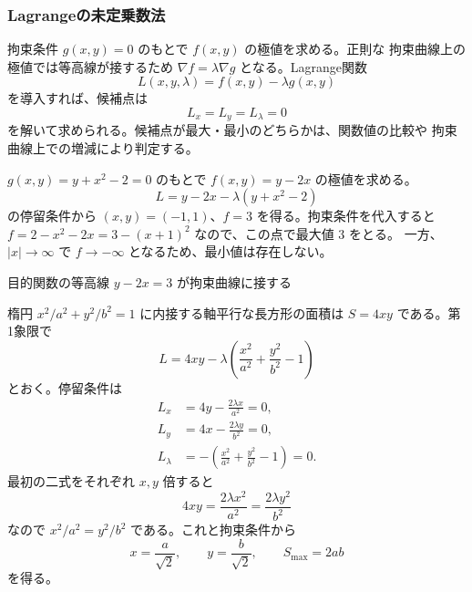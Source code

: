 \subsubsection{Lagrangeの未定乗数法}

拘束条件 $g(x,y)=0$ のもとで $f(x,y)$ の極値を求める。正則な
拘束曲線上の極値では等高線が接するため $\nabla f=\lambda\nabla g$
となる。Lagrange関数
\[
 L(x,y,\lambda)=f(x,y)-\lambda g(x,y)
\]
を導入すれば、候補点は
\begin{equation}
 \boxed{L_x=L_y=L_\lambda=0}
\end{equation}
を解いて求められる。候補点が最大・最小のどちらかは、関数値の比較や
拘束曲線上での増減により判定する。

\begin{example}
$g(x,y)=y+x^2-2=0$ のもとで $f(x,y)=y-2x$ の極値を求める。
\[
 L=y-2x-\lambda(y+x^2-2)
\]
の停留条件から $(x,y)=(-1,1)$、$f=3$ を得る。拘束条件を代入すると
$f=2-x^2-2x=3-(x+1)^2$ なので、この点で最大値 $3$ をとる。
一方、$|x|\to\infty$ で $f\to-\infty$ となるため、最小値は存在しない。

\begin{center}

\small 目的関数の等高線 $y-2x=3$ が拘束曲線に接する
\end{center}
\end{example}

\begin{example}[楕円に内接する長方形]
楕円 $x^2/a^2+y^2/b^2=1$ に内接する軸平行な長方形の面積は
$S=4xy$ である。第1象限で
\[
 L=4xy-\lambda\left(\frac{x^2}{a^2}+\frac{y^2}{b^2}-1\right)
\]
とおく。停留条件は
\begin{align*}
 L_x&=4y-\frac{2\lambda x}{a^2}=0,\\
 L_y&=4x-\frac{2\lambda y}{b^2}=0,\\
 L_\lambda&=-\left(\frac{x^2}{a^2}+\frac{y^2}{b^2}-1\right)=0.
\end{align*}
最初の二式をそれぞれ $x,y$ 倍すると
\[
 4xy=\frac{2\lambda x^2}{a^2}
     =\frac{2\lambda y^2}{b^2}
\]
なので $x^2/a^2=y^2/b^2$ である。これと拘束条件から
\[
 x=\frac{a}{\sqrt2},\qquad y=\frac{b}{\sqrt2},\qquad
 \boxed{S_{\max}=2ab}
\]
を得る。
\begin{center}
\end{center}
\end{example}
